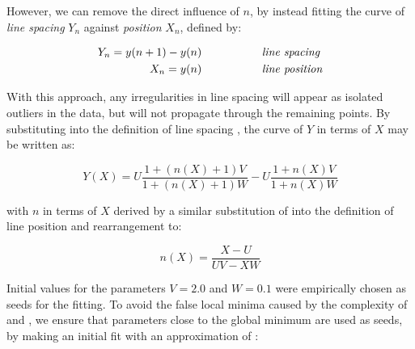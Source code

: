 {%
However, we can remove the direct influence of $n$, by instead fitting
the curve of {\em line spacing} $Y_n$ against {\em position} $X_n$, defined by:


\begin{eqnarray}
Y_n = y(n+1)-y(n) & \mbox{~~~~~~~~~~~~~~~ \it line spacing} \label{linespacingsdefneqn} \\
X_n = y(n) & \mbox{~~~~~~~~~~~~~~~ \it line position} \label{linepositiondefneqn}
\end{eqnarray}

With this approach, any irregularities in line spacing will appear as isolated
outliers in the data, but will not propagate through the remaining points. %
By substituting 
into the definition of line spacing , the curve of
$Y$ in terms of $X$ may be written as: 
}

\begin{equation}
Y(X) = U \frac{1+(n(X)+1)V}{1+(n(X)+1)W} - U \frac{1+n(X)V}{1+n(X)W}
\label{fittingeqn}
\end{equation}

{\parindent 0mm
with $n$ in terms of $X$ derived by a similar substitution of  into the definition of line position  and rearrangement to:
}

\begin{equation}
n(X) = \frac{X-U}{UV-XW}
\label{nfromxeqn}
\end{equation}

Initial values for the parameters $V=2.0$ and $W=0.1$ were empirically chosen as 
seeds for the fitting.
To avoid the false local minima caused by the complexity of  and ,
we ensure that parameters close to the global minimum are used as seeds,
by making an initial fit with an approximation of :

